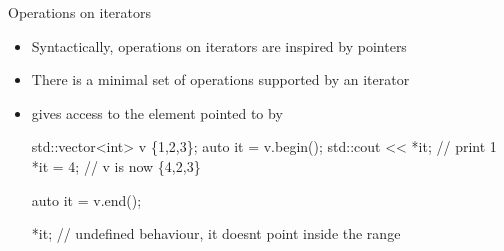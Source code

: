 \begin{frame}[fragile]{Operations on iterators}

  \begin{itemize}
  \item Syntactically, operations on iterators are inspired by pointers
  \item There is a minimal set of operations supported by an iterator 

  \item {} gives access to the element pointed to by 

    \begin{codeblock}
std::vector<int> v \{1,2,3\};
auto it = v.begin();
std::cout << *it; // print 1
*it = 4;          // v is now \{4,2,3\}\end{codeblock}

      \begin{codeblock}
auto it = v.end();

*it; // undefined behaviour, it doesn\textquotesingle{}t point inside the range\end{codeblock}

  \end{itemize}
\end{frame}

